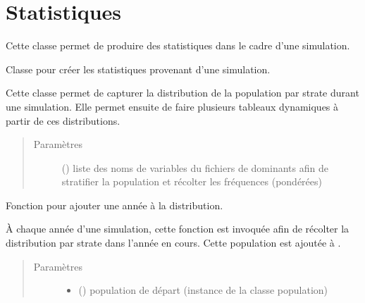 \documentclass[letterpaper,10pt,french]{sphinxmanual}
\begin{document}
\section{Statistiques}
\label{\detokenize{code:statistiques}}
Cette classe permet de produire des statistiques dans le cadre d’une simulation.

\begin{fulllineitems}
\label{\detokenize{code:simgen.statistics}}
Classe pour créer les statistiques provenant d’une simulation.

Cette classe permet de capturer la distribution de la population par strate durant une simulation. Elle permet ensuite de faire plusieurs tableaux dynamiques à partir de ces distributions.
\begin{quote}\begin{description}
\item[{Paramètres}] \leavevmode
{} () \textendash{} liste des noms de variables du fichiers de dominants afin de stratifier la population et récolter les fréquences (pondérées)

\end{description}\end{quote}

\begin{fulllineitems}
\label{\detokenize{code:simgen.statistics.add}}
Fonction pour ajouter une année à la distribution.

À chaque année d’une simulation, cette fonction est invoquée afin de récolter la distribution par strate dans l’année en cours. Cette population est ajoutée à .
\begin{quote}\begin{description}
\item[{Paramètres}] \leavevmode\begin{itemize}
\item {} 
 ({\hyperref[\detokenize{code:simgen.population}]{}}) \textendash{} population de départ (instance de la classe population)


\end{itemize}
\end{description}
\end{quote}
\end{fulllineitems}
\end{fulllineitems}
\end{document}
